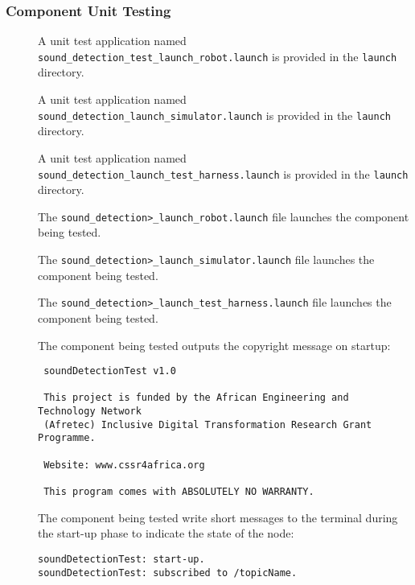 \documentclass{CSSRforAfrica}
\newcommand{\checkboxChecked}{\fbox{\ding{51}}} %
\newcommand{\checkboxDashed}{\fbox{--}}         %
\begin{document}
\subsubsection{Component Unit Testing}
\label{subsubsection:sound_detection_test_unit_testing}

\begin{description}

\item[\checkboxChecked] A unit test application named {\small \verb+sound_detection_test_launch_robot.launch+} is provided in the {\small \verb+launch+} directory.

\item[\checkboxDashed] A unit test application named {\small \verb+sound_detection_launch_simulator.launch+} is provided in the {\small \verb+launch+} directory.

\item[\checkboxChecked] A unit test application named {\small \verb+sound_detection_launch_test_harness.launch+} is provided in the {\small \verb+launch+} directory.

\item[\checkboxChecked] The {\small \verb+sound_detection>_launch_robot.launch+} file launches the component being tested.

\item[\checkboxDashed] The {\small \verb+sound_detection>_launch_simulator.launch+} file launches the component being tested.

\item[\checkboxChecked] The {\small \verb+sound_detection>_launch_test_harness.launch+} file launches the component being tested.

\item[\checkboxChecked] The component being tested outputs the copyright message on startup:
{\small 
\begin{verbatim}
 soundDetectionTest v1.0
 
 This project is funded by the African Engineering and Technology Network 
 (Afretec) Inclusive Digital Transformation Research Grant Programme.
 
 Website: www.cssr4africa.org
 
 This program comes with ABSOLUTELY NO WARRANTY.
\end{verbatim}}

\newpage
\item[\checkboxChecked]  The component being tested write short messages to the terminal during the start-up phase to indicate the state of the node:
{\small 
\begin{verbatim}
soundDetectionTest: start-up.
soundDetectionTest: subscribed to /topicName.
\end{verbatim}}


\end{description}
\end{document}
